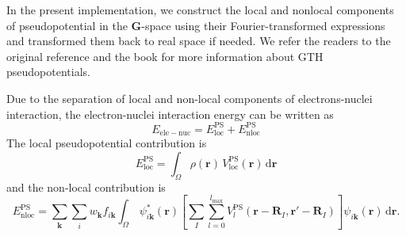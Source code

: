 In the present implementation, we construct the local and nonlocal
components of pseudopotential in the $\mathbf{G}$-space using
their Fourier-transformed expressions
and transformed them back to real space if needed.
We refer the readers to the original
reference \cite{Goedecker1996} and the book \cite{Marx2009}
for more information about GTH pseudopotentials.

Due to the separation of local and non-local components of electrons-nuclei
interaction, the electron-nuclei interaction energy can be written as
\begin{equation}
E_{\mathrm{ele-nuc}} = E^{\mathrm{PS}}_{\mathrm{loc}}
+ E^{\mathrm{PS}}_{\mathrm{nloc}}
\end{equation}
%
The local pseudopotential contribution is
\begin{equation}
E^{\mathrm{PS}}_{\mathrm{loc}} =
\int_{\Omega} \rho(\mathbf{r})\,V^{\mathrm{PS}}_{\mathrm{loc}}(\mathbf{r})\,
\mathrm{d}\mathbf{r}
\end{equation}
%
and the non-local contribution is
\begin{equation}
E^{\mathrm{PS}}_{\mathrm{nloc}} =
\sum_{\mathbf{k}}
\sum_{i}
w_{\mathbf{k}}
f_{i\mathbf{k}}
\int_{\Omega}\,
\psi^{*}_{i\mathbf{k}}(\mathbf{r})
\left[
\sum_{I}\sum_{l=0}^{l_{\mathrm{max}}}
V^{\mathrm{PS}}_{l}(\mathbf{r}-\mathbf{R}_{I},\mathbf{r}'-\mathbf{R}_{I})
\right]
\psi_{i\mathbf{k}}(\mathbf{r})
\,\mathrm{d}\mathbf{r}.
\end{equation}
